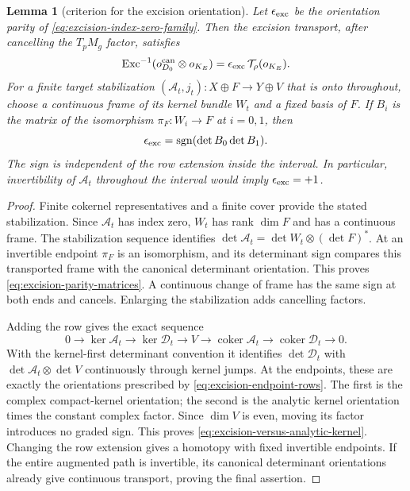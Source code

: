 \documentclass[11pt]{amsart}
\newtheorem{lemma}[theorem]{Lemma}
\theoremstyle{definition}
\theoremstyle{remark}
\theoremstyle{plain}
\begin{document}
\begin{lemma}[criterion for the excision orientation]
\label{lem:excision-orientation-parity}
Let $\epsilon_{\rm exc}$ be the orientation parity of
\eqref{eq:excision-index-zero-family}. Then the excision
transport, after cancelling the $T_pM_g$ factor, satisfies
\begin{equation}\label{eq:excision-versus-analytic-kernel}
 \operatorname{Exc}^{-1}
       (o_{D_0}^{\rm can}\otimes o_{K_E})
                 =\epsilon_{\rm exc}\,\mathcal T_\rho(o_{K_E}).
\end{equation}
For a finite target stabilization
$(\mathcal A_t,j_t):X\oplus F\to Y\oplus V$
that is onto throughout, choose a continuous frame of its
kernel bundle $W_t$ and a fixed basis of $F$.
If $B_i$ is the matrix of the isomorphism
$\pi_F:W_i\to F$ at $i=0,1$, then
\begin{equation}\label{eq:excision-parity-matrices}
             \epsilon_{\rm exc}
                      =\operatorname{sgn}(\det B_0\det B_1).
\end{equation}
The sign is independent of the row extension inside the
interval. In particular, invertibility of $\mathcal A_t$
throughout the interval would imply $\epsilon_{\rm exc}=+1$.
\end{lemma}

\begin{proof}
Finite cokernel representatives and a finite cover provide
the stated stabilization. Since $\mathcal A_t$ has index
zero, $W_t$ has rank $\dim F$ and has a continuous frame.
The stabilization sequence identifies
$\det\mathcal A_t=\det W_t\otimes(\det F)^*$.
At an invertible endpoint $\pi_F$ is an isomorphism, and
its determinant sign compares this transported frame with
the canonical determinant orientation. This proves
\eqref{eq:excision-parity-matrices}. A continuous change
of frame has the same sign at both ends and cancels.
Enlarging the stabilization adds cancelling factors.

Adding the row gives the exact sequence
\[
 0\to\ker\mathcal A_t\to\ker\mathcal D_t\to V
    \to\operatorname{coker}\mathcal A_t
    \to\operatorname{coker}\mathcal D_t\to0.
\]
With the kernel-first determinant convention it identifies
$\det\mathcal D_t$ with
$\det\mathcal A_t\otimes\det V$ continuously through
kernel jumps. At the endpoints, these are exactly the
orientations prescribed by \eqref{eq:excision-endpoint-rows}.
The first is the complex compact-kernel orientation; the
second is the analytic kernel orientation times the constant
complex factor. Since $\dim V$ is even, moving its factor
introduces no graded sign. This proves
\eqref{eq:excision-versus-analytic-kernel}.
Changing the row extension gives a homotopy with fixed
invertible endpoints. If the entire augmented path is
invertible, its canonical determinant orientations already
give continuous transport, proving the final assertion.
\end{proof}
\end{document}
